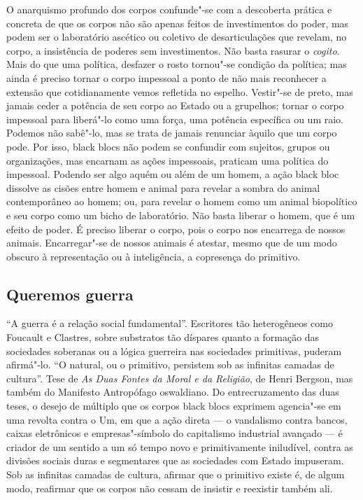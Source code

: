 O anarquismo profundo dos corpos confunde"-se com a descoberta prática e
concreta de que os corpos não são apenas feitos de investimentos do
poder, mas podem ser o laboratório ascético ou coletivo de
desarticulações que revelam, no corpo, a insistência de poderes sem
investimentos. Não basta rasurar o \emph{cogito. }Mais do que uma
política, desfazer o rosto tornou"-se condição da política; mas ainda é
preciso tornar o corpo impessoal a ponto de não mais reconhecer a
extensão que cotidianamente vemos refletida no espelho. Vestir"-se de
preto, mas jamais ceder a potência de seu corpo ao Estado ou a
grupelhos; tornar o corpo impessoal para liberá"-lo como uma força, uma
potência específica ou um raio. Podemos não sabê"-lo, mas se trata de
jamais renunciar àquilo que um corpo pode. Por isso, black blocs não
podem se confundir com sujeitos, grupos ou organizações, mas encarnam as
ações impessoais, praticam uma política do impessoal. Podendo ser algo
aquém ou além de um homem, a ação black bloc dissolve as cisões entre
homem e animal para revelar a sombra do animal contemporâneo ao homem;
ou, para revelar o homem como um animal biopolítico e seu corpo como um
bicho de laboratório. Não basta liberar o homem, que é um efeito de
poder. É preciso liberar o corpo, pois o corpo nos encarrega de nossos
animais. Encarregar"-se de nossos animais é atestar, mesmo que de um modo
obscuro à representação ou à inteligência, a copresença do primitivo.

\subsection{Queremos guerra}

``A guerra é a relação social fundamental''.
Escritores tão heterogêneos como Foucault e Clastres, sobre substratos
tão díspares quanto a formação das sociedades soberanas ou a lógica
guerreira nas sociedades primitivas, puderam afirmá"-lo. ``O natural, ou
o primitivo, persistem sob as infinitas camadas de cultura''. Tese de
\emph{As Duas Fontes da Moral e da Religião}, de Henri Bergson, mas também
do Manifesto Antropófago oswaldiano. Do entrecruzamento das duas teses,
o desejo de múltiplo que os corpos black blocs exprimem agencia"-se em
uma revolta contra o Um, em que a ação direta --- o vandalismo contra
bancos, caixas eletrônicos e empresas"-símbolo do capitalismo industrial
avançado --- é criador de um sentido a um só tempo novo e primitivamente
iniludível, contra as divisões sociais duras e segmentares que as
sociedades com Estado impuseram. Sob as infinitas camadas de cultura,
afirmar que o primitivo existe é, de algum modo, reafirmar que os corpos
não cessam de insistir e reexistir também ali.

